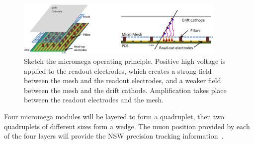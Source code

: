 \begin{figure}
    \centering
    \includegraphics[width = 0.9\textwidth]{figures/micromegas.png}
    \caption{Sketch the micromega operating principle. Positive high voltage is applied to the readout electrodes, which creates a strong field between the mesh and the readout electrodes, and a weaker field between the mesh and the drift cathode. Amplification takes place between the readout electrodes and the mesh. }
    \label{fig:micromega}
\end{figure}

Four micromega modules will be layered to form a quadruplet, then two quadruplets of different sizes form a wedge. The muon position provided by each of the four layers will provide the NSW precision tracking information~\cite{nsw_tdr}.